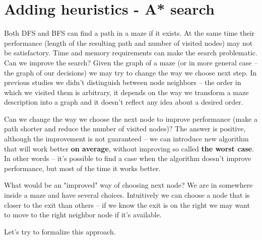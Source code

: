 \section{Adding heuristics - A* search}

Both DFS and BFS can find a path in a maze if it exists.
At the same time their performance (length of the resulting
path and number of visited nodes) may not be satisfactory.
Time and memory requirements can make the search problematic.
Can we improve the search? Given the graph of a maze
(or in more general case -- the graph of our decisions)
we may try to change the way we choose next step. In
previous studies we didn't distinguish between node neighbors --
the order in which we visited them is arbitrary, it depends
on the way we transform a maze description into a graph and
it doesn't reflect any idea about a desired order.

Can we change the way we choose the next node to improve
performance (make a path shorter and reduce the number of
visited nodes)? The answer is positive, although the improvement
is not guaranteed -- we can introduce new algorithm that will
work better \textbf{on average}, without improving so called
\textbf{the worst case}. In other words -- it's possible to find
a case when the algorithm doesn't improve performance, but
most of the time it works better.

What would be an "improved" way of choosing next node?
We are in somewhere inside a maze and have several choices.
Intuitively we can choose a node that is closer to the exit than others --
if we know the exit is on the right we may want to move to the
right neighbor node if it's available.

Let's try to formalize this approach.






